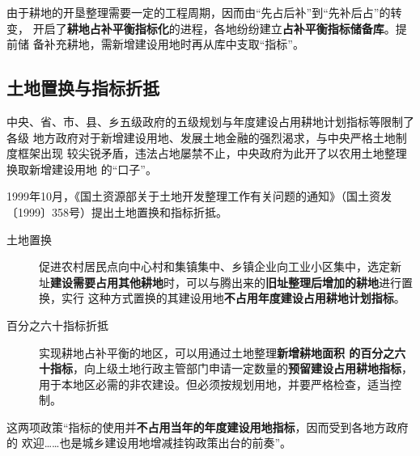 
由于耕地的开垦整理需要一定的工程周期，因而由“先占后补”到“先补后占”的转变，
开启了\textbf{耕地占补平衡指标化}的进程，各地纷纷建立\textbf{占补平衡指标储备库}。提前储
备补充耕地，需新增建设用地时再从库中支取“指标”。



\subsection{土地置换与指标折抵}

中央、省、市、县、乡五级政府的五级规划与年度建设占用耕地计划指标等限制了各级
地方政府对于新增建设用地、发展土地金融的强烈渴求，与中央严格土地制度框架出现
较尖锐矛盾，违法占地屡禁不止，中央政府为此开了以农用土地整理换取新增建设用地
的“口子”。

1999年10月，《国土资源部关于土地开发整理工作有关问题的通知》（国土资发
〔1999〕358号）提出土地置换和指标折抵。

\begin{description}
\item[土地置换] 促进农村居民点向中心村和集镇集中、乡镇企业向工业小区集中，选定新
  址\textbf{建设需要占用其他耕地}时，可以与腾出来的\textbf{旧址整理后增加的耕地}进行置换，实行
  这种方式置换的其建设用地\textbf{不占用年度建设占用耕地计划指标}。


\item[百分之六十指标折抵] 实现耕地占补平衡的地区，可以用通过土地整理\textbf{新增耕地面积
  的百分之六十指标}，向上级土地行政主管部门申请一定数量的\textbf{预留建设占用耕地指标}，
  用于本地区必需的非农建设。但必须按规划用地，并要严格检查，适当控制。
\end{description}

这两项政策“指标的使用并\textbf{不占用当年的年度建设用地指标}，因而受到各地方政府的
欢迎……也是城乡建设用地增减挂钩政策出台的前奏”。

